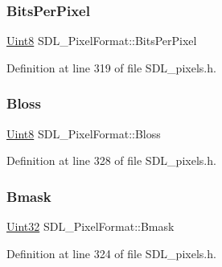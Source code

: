 \mbox{\label{struct_s_d_l___pixel_format_aac533fae3043ef44df01108248e111d8}} 
\subsubsection{\texorpdfstring{BitsPerPixel}{BitsPerPixel}}
{\footnotesize\ttfamily \mbox{\hyperlink{_s_d_l__stdinc_8h_a2944638813a090aa23e62f4da842c3e2}{Uint8}} S\+D\+L\+\_\+\+Pixel\+Format\+::\+Bits\+Per\+Pixel}



Definition at line 319 of file S\+D\+L\+\_\+pixels.\+h.

\mbox{\label{struct_s_d_l___pixel_format_a337072c1bc8b41efdd2da4e95b8c2ff7}} 
\subsubsection{\texorpdfstring{Bloss}{Bloss}}
{\footnotesize\ttfamily \mbox{\hyperlink{_s_d_l__stdinc_8h_a2944638813a090aa23e62f4da842c3e2}{Uint8}} S\+D\+L\+\_\+\+Pixel\+Format\+::\+Bloss}



Definition at line 328 of file S\+D\+L\+\_\+pixels.\+h.

\mbox{\label{struct_s_d_l___pixel_format_ad366812df3ae62edb9ae6cb89234fddb}} 
\subsubsection{\texorpdfstring{Bmask}{Bmask}}
{\footnotesize\ttfamily \mbox{\hyperlink{_s_d_l__stdinc_8h_add440eff171ea5f55cb00c4a9ab8672d}{Uint32}} S\+D\+L\+\_\+\+Pixel\+Format\+::\+Bmask}



Definition at line 324 of file S\+D\+L\+\_\+pixels.\+h.

\mbox{\label{struct_s_d_l___pixel_format_a4212574b67529628d8822ed4eb109754}} 
